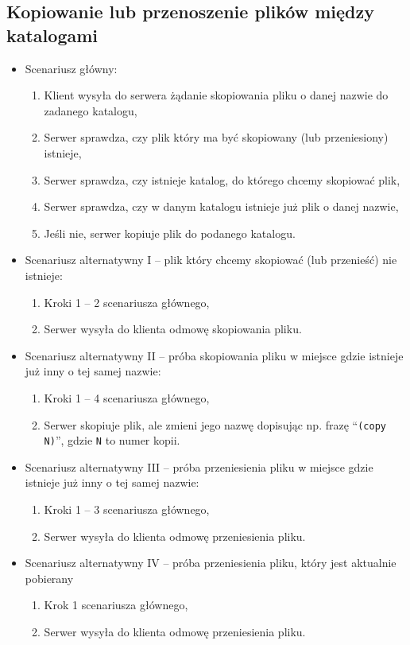 \documentclass[8pt,a4paper]{article}
\newcommand{\quotes}[1]{``#1''}
\newcommand{\quotcode}[1]{\quotes{\texttt{#1}}}
\begin{document}
\subsection{Kopiowanie lub przenoszenie plików między katalogami}
\begin{itemize}
    \item Scenariusz główny:
    \begin{enumerate}
        \item Klient wysyła do serwera żądanie skopiowania pliku o danej nazwie do zadanego katalogu,
        \item Serwer sprawdza, czy plik który ma być skopiowany (lub przeniesiony) istnieje,
        \item Serwer sprawdza, czy istnieje katalog, do którego chcemy skopiować plik,
        \item Serwer sprawdza, czy w danym katalogu istnieje już plik o danej nazwie,
        \item Jeśli nie, serwer kopiuje plik do podanego katalogu.
    \end{enumerate}

    \item Scenariusz alternatywny I -- plik który chcemy skopiować (lub przenieść) nie istnieje:
    \begin{enumerate}
        \item Kroki 1 -- 2 scenariusza głównego,
        \item Serwer wysyła do klienta odmowę skopiowania pliku.
    \end{enumerate}

    \item Scenariusz alternatywny II -- próba skopiowania pliku w miejsce gdzie istnieje już inny o tej samej nazwie:
    \begin{enumerate}
        \item Kroki 1 -- 4 scenariusza głównego,
        \item Serwer skopiuje plik, ale zmieni jego nazwę dopisując np. frazę \quotcode{(copy N)}, gdzie \texttt{N} to numer kopii.
    \end{enumerate}
    
    \item Scenariusz alternatywny III -- próba przeniesienia pliku w miejsce gdzie istnieje już inny o tej samej nazwie:
    \begin{enumerate}
        \item Kroki 1 -- 3 scenariusza głównego,
        \item Serwer wysyła do klienta odmowę przeniesienia pliku.
    \end{enumerate}
    
    \item Scenariusz alternatywny IV -- próba przeniesienia pliku, który jest aktualnie pobierany
    \begin{enumerate}
        \item Krok 1 scenariusza głównego,
        \item Serwer wysyła do klienta odmowę przeniesienia pliku.
    \end{enumerate}
\end{itemize}
\end{document}
